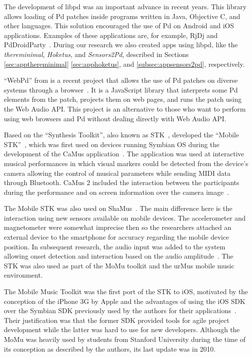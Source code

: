 The development of libpd was an important advance in recent years.
This library allows loading of Pd patches inside programs written in Java, Objective C, and other languages.
This solution encouraged the use of Pd on Android and iOS applications.
Examples of these applications are, for example, RjDj and PdDroidParty~\citep{Brinkmann2011embeddingpd,Brinkmann2012makingmusicalapps}.
During our research we also created apps using libpd, like the \textit{thereminimal}, \textit{Hoketus}, and \textit{Sensors2Pd}, described in Sections \ref{sec:appthereminimal} \ref{sec:apphoketus}, and \ref{subsec:appsensors2pd}, respectively.

``WebPd'' from \citeauthor{Piquemal2017webpd} is a recent project that allows the use of Pd patches on diverse systems through a browser~\citep{Piquemal2017webpd}.
It is a JavaScript library that interprets some Pd elements from the patch, projects them on web pages, and runs the patch using the Web Audio API.
This project is an alternative to those who want to perform using web browsers and Pd without dealing directly with Web Audio API.

Based on the ``Synthesis Toolkit'', also known as STK~\citep{Cook1999stk}, \citeauthor{Essl2006mobilestk} developed the ``Mobile STK''~\citep{Essl2006mobilestk}, which was first used on devices running  Symbian OS during the development of the CaMus application~\citep{Rohs2006camus}.
The application was used at interactive musical performances in which visual markers could be detected from the device's camera allowing the control of musical parameters while sending MIDI data through Bluetooth.
CaMus 2 included the interaction between the participants during the performance and on screen information over the camera image~\citep{Rohs2007camus2}.

The Mobile STK was also used on ShaMus~\citep{Essl2007shamus}.
The main difference here is the interaction using new sensors available on mobile devices.
The accelerometer and magnetometer were somewhat imprecise then so the researchers attached an external device to the smartphone for accuracy regarding the mobile device position.
In subsequent research, the audio input was added to the system allowing onset detection and interaction based on the audio amplitude~\citep{Misra2008microphone}. 
The STK was also used as part of the MoMu toolkit and the urMus mobile music environment. 

The Mobile Music Toolkit was the first port of the STK to iOS, motivated by the conception of the iPhone 3G by Apple and the advantages of using the iOS SDK over the Symbian SDK previously used by the authors for their applications~\citep{Bryan2010momu}.
Their justification was that the former SDK provided tools for agile project development while the latter was hard to use for new developers.
Although the MoMu was heavily used by students from Stanford University during the time of its conception as described by the authors, its last update was in 2010.

